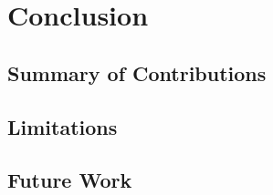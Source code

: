 \chapter{Conclusion}
\label{chap:conclusion}

\section{Summary of Contributions}
\label{sec:summary-contributions}

\section{Limitations}
\label{sec:limitations}

\section{Future Work}
\label{sec:future-work}
